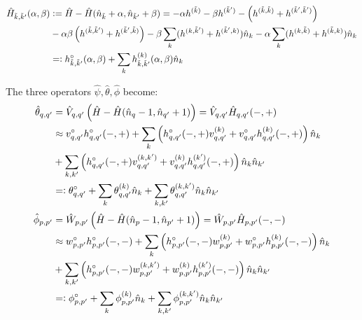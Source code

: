 \begin{appendix}
\begin{align}
\hat H_{\tilde k,\tilde k^\prime}(\alpha,\beta)&\vcentcolon=\hat H - \hat H(\hat n_{\tilde k}+\alpha,\hat n_{\tilde k^\prime}+\beta) = -\alpha h^{(\tilde k)}-\beta h^{(\tilde k^\prime)}-\left(h^{(\tilde k,\tilde k)}+h^{(\tilde k^\prime,\tilde k^\prime)}\right)\nonumber\\ &-\alpha\beta\left(h^{(\tilde k,\tilde k^\prime)}+h^{(\tilde k^\prime,\tilde k)}\right)
-\beta \sum\limits_{k} (h^{(k,\tilde k^\prime)}+h^{(\tilde k^\prime,k)})\hat n_k-\alpha \sum\limits_{k}( h^{(k,\tilde k)}+ h^{(\tilde k,k)})\hat n_k\nonumber\\
&=\vcentcolon h_{\tilde k,\tilde k^\prime}^{\circ}(\alpha,\beta) + \sum\limits_k h_{\tilde k,\tilde k^\prime}^{(k)}(\alpha,\beta)\hat n_k  
\end{align}

The three operators $\hat\psi,\hat\theta,\hat\phi$ become:
\begin{subequations}
\begin{align}
\hat\theta_{q,q^\prime}&=\hat V_{q,q^\prime} \left(\hat H - \hat H(\hat n_q-1,\hat n_{q^\prime}+1)\right)=\hat V_{q,q^\prime}\hat H_{q,q^\prime}(-,+)\nonumber\\
&\approx  v_{q,q^\prime}^{\circ}h^{\circ}_{q,q^\prime}(-,+)+\Sum_k \left(h^\circ_{q,q^\prime}(-,+) v_{q,q^\prime}^{(k)} + v_{q,q^\prime}^{\circ}h^{(k)}_{q,q^\prime}(-,+)\right)\hat n_k \nonumber\\
&+ \Sum_{k,k^\prime} \left( h^\circ_{q,q^\prime}(-,+) v_{q,q^\prime}^{(k,k^\prime)}+v_{q,q^\prime}^{(k)}h^{(k^\prime)}_{q,q^\prime}(-,+)\right)\hat n_k\hat n_{k^\prime}\nonumber\\
&\eqdef \theta_{q,q^\prime}^{\circ} + \Sum_k \theta_{q,q^\prime}^{(k)}\hat n_k + \Sum_{k,k^\prime} \theta_{q,q^\prime}^{(k,k^\prime)}\hat n_k\hat n_ {k^\prime}\\
\hat\phi_{p,p^\prime}&=\hat W_{p,p^\prime} \left(\hat H - \hat H(\hat n_p-1,\hat n_{p^\prime}+1)\right)=\hat W_{p,p^\prime}\hat H_{p,p^\prime}(-,-)\nonumber\\
&\approx  w_{p,p^\prime}^{\circ}h^{\circ}_{p,p^\prime}(-,-)+\Sum_k \left(h^\circ_{p,p^\prime}(-,-) w_{p,p^\prime}^{(k)} + w_{p,p^\prime}^{\circ}h^{(k)}_{p,p^\prime}(-,-)\right)\hat n_k \nonumber\\
&+ \Sum_{k,k^\prime} \left( h^\circ_{p,p^\prime}(-,-) w_{p,p^\prime}^{(k,k^\prime)}+w_{p,p^\prime}^{(k)}h^{(k^\prime)}_{p,p^\prime}(-,-)\right)\hat n_k\hat n_{k^\prime}\nonumber\\
&\eqdef \phi_{p,p^\prime}^{\circ} + \Sum_k \phi_{p,p^\prime}^{(k)}\hat n_k + \Sum_{k,k^\prime} \phi_{p,p^\prime}^{(k,k^\prime)}\hat n_k\hat n_ {k^\prime}\\

\end{align}
\end{subequations}
\end{appendix}
